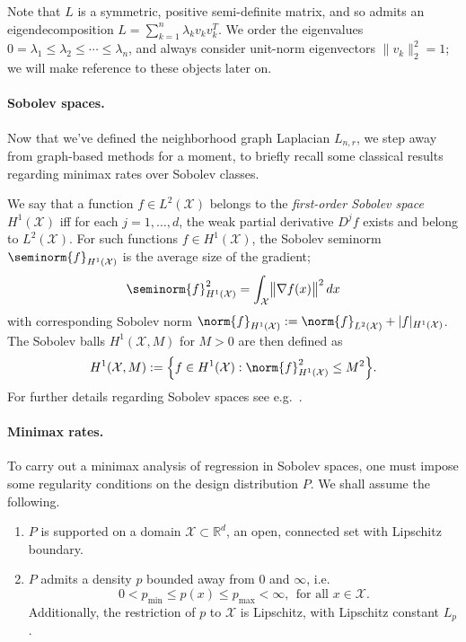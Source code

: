 \documentclass[twoside]{article}
\newcommand{\Reals}{\mathbb{R}}
\newcommand{\1}{\mathbf{1}}
\newcommand{\Rd}{\Reals^d}
\newcommand{\Lap}{L}
\newcommand{\Xset}{\mathcal{X}}
\newcommand{\Leb}{L}
\theoremstyle{definition}
\theoremstyle{remark}
\begin{document}
Note that $L$ is a symmetric, positive semi-definite matrix, and so admits an eigendecomposition $L = \sum_{k = 1}^{n} \lambda_k v_k v_k^T$. We order the eigenvalues $0 = \lambda_1 \leq \lambda_2 \leq \cdots \leq \lambda_n$, and always consider unit-norm eigenvectors $\|v_k\|_2^2 = 1$; we will make reference to these objects later on.

\paragraph{Sobolev spaces.}
Now that we've defined the neighborhood graph Laplacian $\Lap_{n,r}$, we step away from graph-based methods for a moment, to briefly recall some classical results regarding minimax rates over Sobolev classes.

We say that a function $f \in \Leb^2(\Xset)$ belongs to the \emph{first-order Sobolev space} $H^1(\Xset)$ iff for each $j = 1,\ldots,d$, the weak partial derivative $D^jf$ exists and belong to $\Leb^2(\Xset)$. For such functions $f \in H^1(\Xset)$, the Sobolev seminorm $\seminorm{f}_{H^{1}(\Xset)}$ is the average size of the gradient;
\begin{equation*}
\seminorm{f}_{H^1(\Xset)}^2 = \int_{\Xset} \bigl\|\nabla f(x)\bigr\|^2 \,dx
\end{equation*}
with corresponding Sobolev norm $\norm{f}_{H^1(\Xset)} := \norm{f}_{\Leb^2(\Xset)} + |f|_{H^1(\Xset)}$. The Sobolev balls $H^1(\Xset,M)$ for $M > 0$ are then defined as
\begin{equation*}
H^1(\Xset,M) := \Bigl\{f \in H^1(\Xset): \norm{f}_{H^1(\Xset)}^2 \leq M^2\Bigr\}.
\end{equation*}
For further details regarding Sobolev spaces see e.g.~\citep{evans10,leoni2017}.

\paragraph{Minimax rates.}
To carry out a minimax analysis of regression in Sobolev spaces, one must impose some regularity conditions on the design distribution $P$. We shall assume the following.
\begin{enumerate}[label=(P\arabic*)]
	\item
	\label{asmp:domain}
	$P$ is supported on a domain $\Xset \subset \Rd$, an open, connected set with Lipschitz boundary.
	\item
	\label{asmp:bounded_lipschitz_density} 
	$P$ admits a density $p$ bounded away from $0$ and $\infty$, i.e.
	\begin{equation*}
	0 < p_{\min} \leq p(x) \leq p_{\max} < \infty,~~\textrm{for all $x \in \Xset$.}
	\end{equation*}
	Additionally, the restriction of $p$ to $\Xset$ is Lipschitz, with Lipschitz constant $L_p$.
\end{enumerate}
\end{document}

